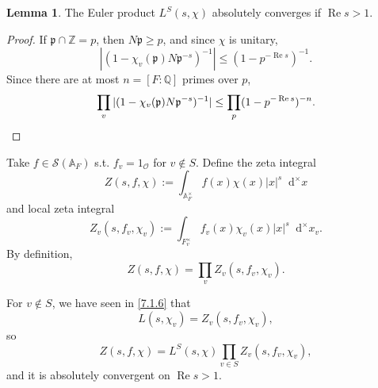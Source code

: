 \documentclass{article}
\newtheorem{theorem}{Theorem}
\theoremstyle{definition}
\newtheorem{lemma}{Lemma}[section]
\theoremstyle{remark}
\renewcommand{\Re}{\mathop{\mathrm{Re}}}
\renewcommand{\hat}{\widehat}
\newcommand{\R}{\mathbb{R}}
\newcommand{\C}{\mathbb{C}}
\newcommand{\Q}{\mathbb{Q}}
\newcommand{\Z}{\mathbb{Z}}
\newcommand{\adele}[1]{\mathbb{A}_{#1}}
\newcommand{\idele}[1]{\mathbb{A}_{#1}^{\times}}
\newcommand{\ideone}[1]{\mathbb{A}_{#1}^{\times, 1}}
\newcommand{\dxm}{\mathop{}\!\mathrm{d}^{\times}x}
\renewcommand{\O}{\mathcal{O}}
\DeclareMathOperator{\vol}{vol}
\newcommand{\frp}{\mathfrak{p}}
\begin{document}
\begin{lemma}
    The Euler product $L^S(s, \chi)$ absolutely converges if $\Re s > 1$.
\end{lemma}
\begin{proof}
    If $\frp\cap \Z = p$, then $N\frp\ge p$, and since $\chi$ is unitary, \[|(1 - \chi_v(\mathfrak{p})N\mathfrak{p}^{-s})^{-1}| \le (1-p^{-\Re s})^{-1}.\]
    Since there are at most $n = [F:\Q]$ primes over $p$, \[\prod_v |(1 - \chi_v(\mathfrak{p})N\mathfrak{p}^{-s})^{-1}| \le \prod_p(1-p^{-\Re s})^{-n}.\qedhere\]
\end{proof}

Take $f\in\mathcal{S}(\adele{F})$ s.t. $f_v = 1_\O$ for $v\notin S$.
Define the zeta integral\[Z(s, f, \chi) := \int_{\idele{F}} f(x)\chi(x)|x|^s\dxm\]
and local zeta integral \[Z_v(s, f_v, \chi_v) := \int_{F_v^\times}f_v(x)\chi_v(x)|x|^s\dxm_v.\]
By definition, \[Z(s, f, \chi) = \prod_v Z_v(s, f_v, \chi_v).\]

For $v\notin S$, we have seen in \cref{7.1.6} that \[L(s, \chi_v) = Z_v(s, f_v, \chi_v),\]
so \[Z(s, f, \chi)=L^S(s, \chi)\prod_{v\in S}Z_v(s, f_v, \chi_v),\]
and it is absolutely convergent on $\Re s>1$.

\end{document}
